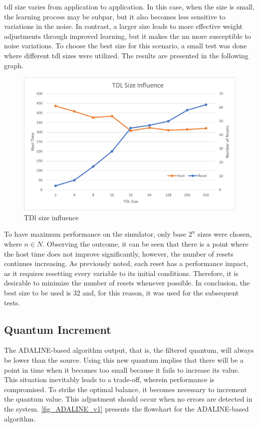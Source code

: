 \gls{tdl} size varies from application to application. In this case, when the size is small, the learning process may be subpar, but it also 
becomes less sensitive to variations in the noise. In contrast, a larger size leads to more effective weight adjustments through improved learning, 
but it makes the \gls{nn} more susceptible to noise variations. To choose the best size for this scenario, a small test was done where different 
\gls{tdl} sizes were utilized. The results are presented in the following graph.

\begin{figure}[H]
	\centering
 	\includegraphics[width=0.7\linewidth]{Images/ResetVsHost.png}
 	\caption{TDl size influence}
	 \label{fig_ResetVsHost}
\end{figure}

To have maximum performance on the simulator, only base $2^{n}$ sizes were chosen, where $n \in N$. Observing the outcome, it can be seen that 
there is a point where the host time does not improve significantly, however, the number of resets continues increasing. As previously noted, 
each reset has a 
performance impact, as it requires resetting every variable to its initial conditions. Therefore, it is desirable to minimize the number of 
resets whenever possible. In conclusion, the best size to be used is 32 and, for this reason, it was used for the subsequent tests.

\subsection{Quantum Increment}

The ADALINE-based algorithm output, that is, the filtered quantum, will always be lower than the source. Using this new quantum implies that 
there will be a point in time when it becomes too small because it fails to increase its value. This situation inevitably leads to a 
trade-off, wherein performance is compromised. To strike the optimal balance, it becomes necessary to increment the quantum value. This adjustment 
should occur when no errors are detected in the system. \autoref{fig_ADALINE_v1} presents the flowchart for the ADALINE-based algorithm.

